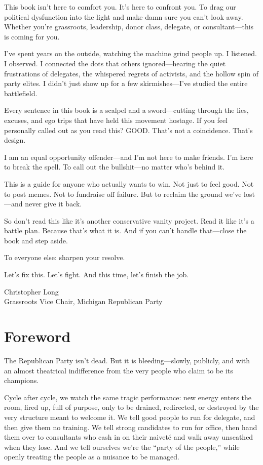 \documentclass[12pt]{book}
\begin{document}
This book isn’t here to comfort you. It’s here to confront you. To drag our political dysfunction into the light and make damn sure you can't look away. Whether you're grassroots, leadership, donor class, delegate, or consultant—this is coming for you.

I’ve spent years on the outside, watching the machine grind people up. I listened. I observed. I connected the dots that others ignored—hearing the quiet frustrations of delegates, the whispered regrets of activists, and the hollow spin of party elites. I didn’t just show up for a few skirmishes—I’ve studied the entire battlefield.

Every sentence in this book is a scalpel and a sword—cutting through the lies, excuses, and ego trips that have held this movement hostage. If you feel personally called out as you read this? GOOD. That’s not a coincidence. That’s design.

I am an equal opportunity offender—and I’m not here to make friends. I’m here to break the spell. To call out the bullshit—no matter who’s behind it.

This is a guide for anyone who actually wants to win. Not just to feel good. Not to post memes. Not to fundraise off failure. But to reclaim the ground we’ve lost—and never give it back.

So don’t read this like it’s another conservative vanity project. Read it like it’s a battle plan. Because that’s what it is. And if you can’t handle that—close the book and step aside.

To everyone else: sharpen your resolve.

Let’s fix this. Let’s fight. And this time, let’s finish the job.

\vfill
Christopher Long \\
Grassroots Vice Chair, Michigan Republican Party




\chapter*{Foreword}

The Republican Party isn’t dead. But it is bleeding—slowly, publicly, and with an almost theatrical indifference from the very people who claim to be its champions.

Cycle after cycle, we watch the same tragic performance: new energy enters the room, fired up, full of purpose, only to be drained, redirected, or destroyed by the very structure meant to welcome it. We tell good people to run for delegate, and then give them no training. We tell strong candidates to run for office, then hand them over to consultants who cash in on their naiveté and walk away unscathed when they lose. And we tell ourselves we’re the “party of the people,” while openly treating the people as a nuisance to be managed.
\end{document}
